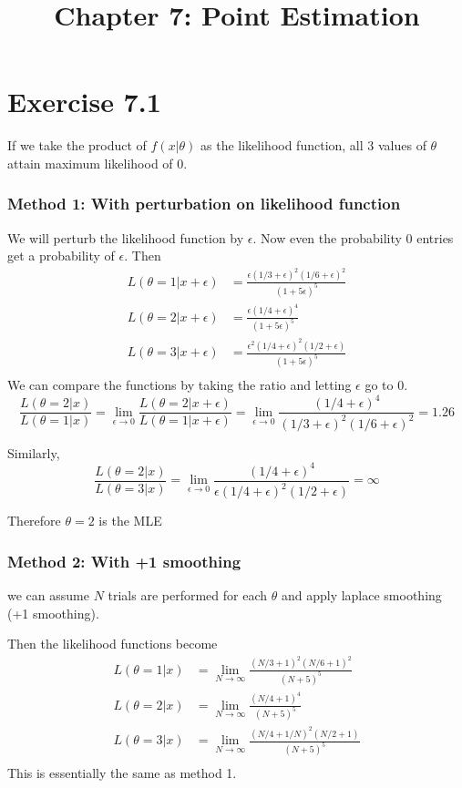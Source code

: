 \documentclass[12pt]{article}
\title{Chapter 7: Point Estimation}
\begin{document}
	\maketitle
	
\section*{Exercise 7.1}
 If we take the product of $f(x|\theta)$ as the likelihood function, all 3 values of $\theta$ attain maximum likelihood of 0. 
 
 \subsubsection*{Method 1: With perturbation on likelihood function}
 We will perturb the likelihood function by $\epsilon$. Now even the probability 0 entries get a probability of $\epsilon$. Then 
 \begin{equation*}
 	\begin{split}
 		L(\theta=1 | x + \epsilon) &= \frac{\epsilon (1/3 + \epsilon )^2 (1/6 + \epsilon)^2}{(1 + 5\epsilon)^5} \\
 		L(\theta=2 | x + \epsilon) &= \frac{\epsilon (1/4 + \epsilon )^4}{(1 + 5\epsilon)^5} \\
 		L(\theta=3 | x + \epsilon) &= \frac{\epsilon^2 (1/4 + \epsilon )^2 (1/2 + \epsilon)}{(1 + 5\epsilon)^5} \\
 	\end{split}
 \end{equation*}
 We can compare the functions by taking the ratio and letting $\epsilon$ go to 0.  
 $$
 \frac{ L(\theta = 2 | x ) }{ L(\theta = 1 | x) } = \lim_{\epsilon \rightarrow 0} \frac{ L(\theta = 2 | x + \epsilon) }{ L(\theta = 1 | x + \epsilon) } = \lim_{\epsilon \rightarrow 0} \frac{(1/4 + \epsilon )^4}{(1/3 + \epsilon )^2 (1/6 + \epsilon)^2} = 1.26
 $$

 Similarly, $$
 \frac{L(\theta = 2| x)} {L(\theta = 3 | x)} = \lim_{\epsilon \rightarrow 0} \frac{(1/4 + \epsilon )^4}{\epsilon (1/4 + \epsilon )^2 (1/2 + \epsilon)} = \infty$$
 
Therefore $\theta=2$ is the MLE

 \subsubsection*{Method 2: With +1 smoothing}
 we can assume $N$ trials are performed for each $\theta$ and apply laplace smoothing (+1 smoothing). 
 
 Then the likelihood functions become 
 \begin{equation*}
 	\begin{split}
     L(\theta=1|x) &= \lim_{N \rightarrow \infty}\frac{(N/3 + 1)^2(N/6 + 1)^2}{(N + 5)^5} \\
 	L(\theta=2|x) &= \lim_{N \rightarrow \infty}\frac{(N/4 + 1)^4}{(N + 5)^5} \\
 	L(\theta=3|x) &= \lim_{N \rightarrow \infty}\frac{(N/4 + 1/ N)^2(N/2 + 1)}{(N + 5)^5} \\
 	\end{split}
 \end{equation*}
This is essentially the same as method 1.

 
\end{document}
